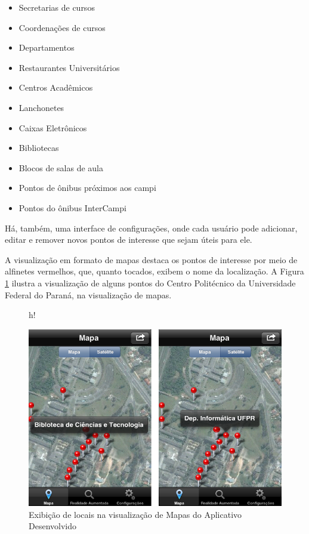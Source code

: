 \begin{itemize}
    \item Secretarias de cursos
    \item Coordenações de cursos
    \item Departamentos
    \item Restaurantes Universitários
    \item Centros Acadêmicos
    \item Lanchonetes
    \item Caixas Eletrônicos
    \item Bibliotecas
    \item Blocos de salas de aula
    \item Pontos de ônibus próximos aos campi
    \item Pontos do ônibus InterCampi
\end{itemize}



Há, também, uma interface de configurações, onde cada usuário pode adicionar, editar e remover
novos pontos de interesse que sejam úteis para ele.


A visualização em formato de mapas destaca os pontos de interesse por meio de alfinetes vermelhos,
que, quanto tocados, exibem o nome da localização. A Figura \ref{fig:pins-maps} ilustra a visualização de alguns
pontos do Centro Politécnico da Universidade Federal do Paraná, na visualização de mapas.

\begin{figure}{h!}
    \centering
    \caption{Exibição de locais na visualização de Mapas do Aplicativo Desenvolvido}
    \label{fig:pins-maps}
    \includegraphics[width=14cm]{resources/App_Maps_Screenshots/mapa-pins.png}
\end{figure}


